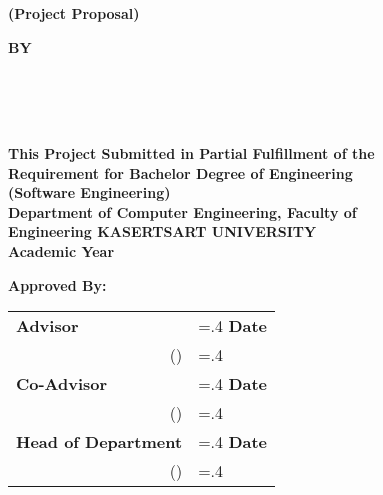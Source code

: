 \thispagestyle{empty}
\begin{center}
    {\huge\textbf{\usevar{\srsTitle}}} %
    {\huge\textbf{(Project Proposal)}}\vspace{1in}

    {\huge\textbf{BY}}\vspace{.5in}

    {\huge\textbf{%
        \usevar{\srsAuthorOne} \\
        \usevar{\srsAuthorTwo} \\
        \usevar{\srsAuthorThree} \\
    }}\vfill

    {\large\textbf{%
        This Project Submitted in Partial Fulfillment of the\\
        Requirement for Bachelor Degree of Engineering\\
        (Software Engineering)\\
        Department of Computer Engineering, Faculty of\\
        Engineering KASERTSART UNIVERSITY\\
        Academic Year \usevar{\srsAcademicYear}\\
    }}
\end{center}

\vspace{.5in}

{\large\textbf{Approved By:}}\vspace{.2in}

\begin{tabularx}{1\textwidth}{X >{\hsize=.4\hsize}X}
    \textbf{Advisor}\dotfill & \textbf{Date}\dotfill \\
    \multicolumn{1}{r}{(\usevar{\srsAdvisorName})} & \\[.1in]

    \textbf{Co-Advisor}\dotfill & \textbf{Date}\dotfill \\
    \multicolumn{1}{r}{(\usevar{\srsCoAdvisorName})} & \\[.1in]
    
    \textbf{Head of Department}\dotfill & \textbf{Date}\dotfill \\
    \multicolumn{1}{r}{(\usevar{\srsHoDName})} & \\
\end{tabularx}

\restoregeometry